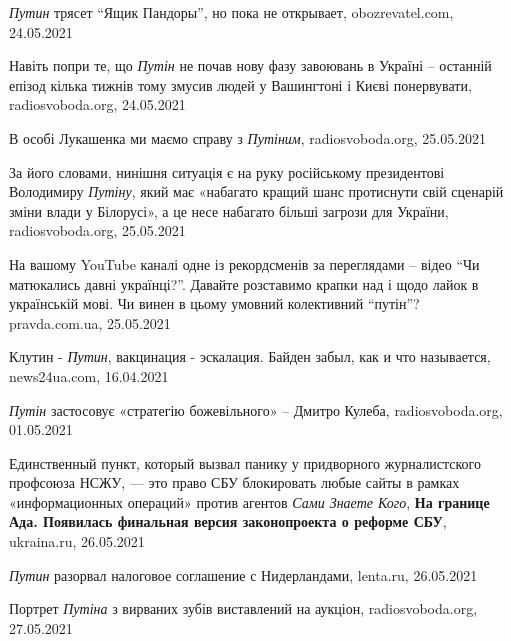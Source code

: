  
 
 
 
 

\emph{Путин} трясет \enquote{Ящик Пандоры}, но пока не открывает,
obozrevatel.com, 24.05.2021

Навіть попри те, що \emph{Путін} не почав нову фазу завоювань в Україні –
останній епізод кілька тижнів тому змусив людей у Вашингтоні і Києві
понервувати, radiosvoboda.org, 24.05.2021

В особі Лукашенка ми маємо справу з \emph{Путіним}, radiosvoboda.org, 25.05.2021

За його словами, нинішня ситуація є на руку російському президентові Володимиру
\emph{Путіну}, який має «набагато кращий шанс протиснути свій сценарій зміни
влади у Білорусі», а це несе набагато більші загрози для України,
radiosvoboda.org, 25.05.2021

На вашому YouTube каналі одне із рекордсменів за переглядами – відео \enquote{Чи
матюкались давні українці?}. Давайте розставимо крапки над і щодо лайок в
українській мові. Чи винен в цьому умовний колективний \enquote{путін}?
pravda.com.ua, 25.05.2021

Клутин - \emph{Путин}, вакцинация - эскалация. Байден забыл, как и что
называется, news24ua.com, 16.04.2021

\emph{Путін} застосовує «стратегію божевільного» – Дмитро Кулеба, radiosvoboda.org, 01.05.2021

Единственный пункт, который вызвал панику у придворного журналистского
профсоюза НСЖУ, — это право СБУ блокировать любые сайты в рамках
«информационных операций» против агентов \emph{Сами Знаете Кого}, \textbf{На
границе Ада. Появилась финальная версия законопроекта о реформе СБУ},
ukraina.ru, 26.05.2021

\emph{Путин} разорвал налоговое соглашение с Нидерландами, lenta.ru, 26.05.2021

Портрет \emph{Путіна} з вирваних зубів виставлений на аукціон, radiosvoboda.org,
27.05.2021
